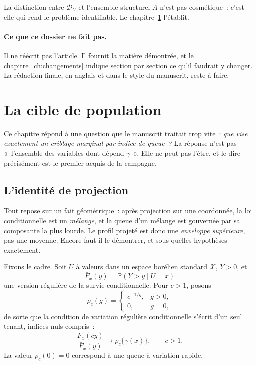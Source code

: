 \documentclass[11pt]{article}
\theoremstyle{plain}
\theoremstyle{definition}
\theoremstyle{remark}
\newcommand{\Pp}{\mathbb P}
\newcommand{\1}{\mathbf 1}
\newcommand{\D}{\mathcal D_U}
\begin{document}
\noindent
La distinction entre $\D$ et l'ensemble structurel $A$ n'est pas
cosmétique~: c'est elle qui rend le problème identifiable. Le
chapitre~\ref{ch:cible} l'établit.

\paragraph{Ce que ce dossier ne fait pas.} Il ne réécrit pas l'article.
Il fournit la matière démontrée, et le chapitre~\ref{ch:changements}
indique section par section ce qu'il faudrait y changer. La rédaction
finale, en anglais et dans le style du manuscrit, reste à faire.

\clearpage

\section{La cible de population}\label{ch:cible}

Ce chapitre répond à une question que le manuscrit traitait trop vite~:
\emph{que vise exactement un criblage marginal par indice de queue~?}
La réponse n'est pas «~l'ensemble des variables dont dépend $\gamma$~».
Elle ne peut pas l'être, et le dire précisément est le premier acquis de
la campagne.

\subsection{L'identité de projection}

Tout repose sur un fait géométrique~: après projection sur une
coordonnée, la loi conditionnelle est un \emph{mélange}, et la queue d'un
mélange est gouvernée par sa composante la plus lourde. Le profil projeté
est donc une \emph{enveloppe supérieure}, pas une moyenne. Encore
faut-il le démontrer, et sous quelles hypothèses exactement.

Fixons le cadre. Soit $U$ à valeurs dans un espace borélien standard
$\mathcal X$, $Y>0$, et
\[
 \bar F_x(y)=\Pp(Y>y\mid U=x)
\]
une version régulière de la survie conditionnelle. Pour $c>1$, posons
\[
 \rho_c(g)=
 \begin{cases}
  c^{-1/g}, & g>0,\\
  0, & g=0,
 \end{cases}
\]
de sorte que la condition de variation régulière conditionnelle s'écrit
d'un seul tenant, indices nuls compris~:
\begin{equation}
 \frac{\bar F_x(cy)}{\bar F_x(y)}\longrightarrow\rho_c\{\gamma(x)\},
 \qquad c>1.
 \label{eq:rvc}
\end{equation}
La valeur $\rho_c(0)=0$ correspond à une queue à variation rapide.
\end{document}
